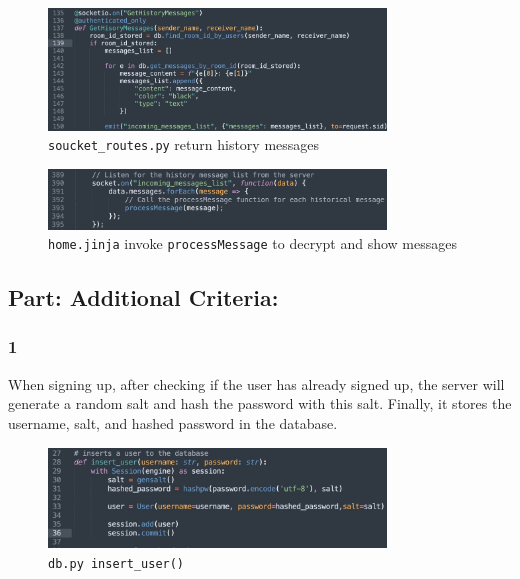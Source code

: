 \documentclass[12pt]{article}
\begin{document}
            \begin{figure}[H]
                \centering
                \includegraphics[width=0.8\textwidth]{graphs/return_history_message.jpg}
                \caption{\texttt{soucket\_routes.py} return history messages}
                \label{return history message}
            \end{figure}


            \begin{figure}[H]
                \centering
                \includegraphics[width=0.8\textwidth]{graphs/show_history_message.jpg}
                \caption{\texttt{home.jinja} invoke \texttt{processMessage} to decrypt and show messages}
                \label{show history message}
            \end{figure}

    \subsection*{Part: Additional Criteria:}

        \subsubsection*{1} When signing up, after checking if the user has already signed up, the server will generate a random salt and hash the password with this salt. Finally, it stores the username, salt, and hashed password in the database.

        \begin{figure}[H]
            \centering
            \includegraphics[width=0.8\textwidth]{graphs/insert_user.jpg}
            \caption{\texttt{db.py insert\_user()}}
        \end{figure}
\end{document}
